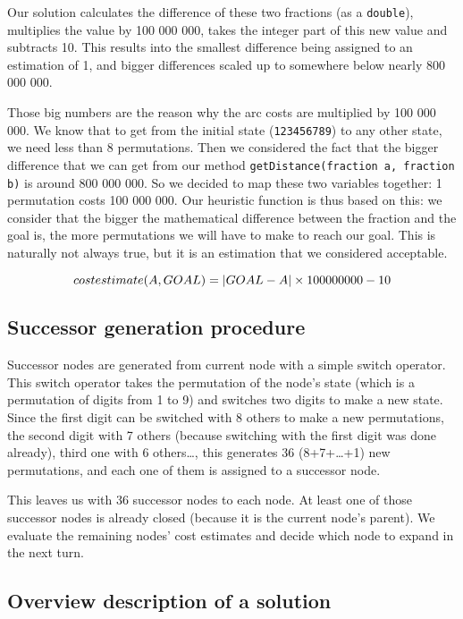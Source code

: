 \documentclass{article}
\begin{document}
Our solution calculates the difference of these two fractions (as a
\texttt{double}), multiplies the value by 100 000 000, takes the integer part of
this new value and subtracts 10.
This results into the smallest difference being assigned to an estimation of 1,
and bigger differences scaled up to somewhere below nearly 800 000 000.

Those big numbers are the reason why the arc costs are multiplied by 100 000
000.
We know that to get from the initial state (\texttt{123456789}) to any
other state, we need less than 8 permutations. Then we considered the fact that the
bigger difference that we can get from our method \texttt{getDistance(fraction
a, fraction b)} is around 800 000 000. So we decided to map these two variables
together: 1 permutation costs 100 000 000.
Our heuristic function is thus based on this: we consider that the bigger the
mathematical difference between the fraction and the goal is, the more
permutations we will have to make to reach our goal.
This is naturally not always true, but it is an estimation that we considered
acceptable.

\[
cost estimate (A, GOAL) = \lvert GOAL - A\rvert \times 100 000 000 - 10
\]


\subsection{Successor generation procedure}

Successor nodes are generated from current node with a simple switch operator.
This switch operator takes the permutation of the node's state (which is a
permutation of digits from 1 to 9) and switches two digits to make a new state.
Since the first digit can be switched with 8 others to make a new permutations,
the second digit with 7 others (because switching with the first digit
was done already), third one with 6 others\ldots, this generates 36
(8+7+\ldots+1) new permutations, and each one of them is assigned to a successor
node.

This leaves us with 36 successor nodes to each node. At least one of those
successor nodes is already closed (because it is the current node's parent). We
evaluate the remaining nodes' cost estimates and decide which node to expand in
the next turn.

\subsection{Overview description of a solution}
\end{document}
